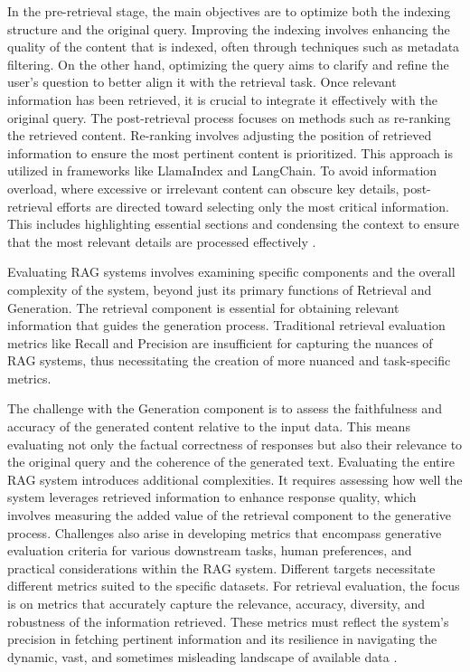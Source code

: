 In the pre-retrieval stage, the main objectives are to optimize both the indexing structure and the original query. Improving the indexing involves enhancing the quality of the content that is indexed, often through techniques such as metadata filtering. On the other hand, optimizing the query aims to clarify and refine the user's question to better align it with the retrieval task. Once relevant information has been retrieved, it is crucial to integrate it effectively with the original query. The post-retrieval process focuses on methods such as re-ranking the retrieved content. Re-ranking involves adjusting the position of retrieved information to ensure the most pertinent content is prioritized. This approach is utilized in frameworks like LlamaIndex and LangChain. To avoid information overload, where excessive or irrelevant content can obscure key details, post-retrieval efforts are directed toward selecting only the most critical information. This includes highlighting essential sections and condensing the context to ensure that the most relevant details are processed effectively \cite{Gao.18Dec2023}.

Evaluating RAG systems involves examining specific components and the overall complexity of the system, beyond just its primary functions of Retrieval and Generation. The retrieval component is essential for obtaining relevant information that guides the generation process. Traditional retrieval evaluation metrics like Recall and Precision are insufficient for capturing the nuances of RAG systems, thus necessitating the creation of more nuanced and task-specific metrics.

The challenge with the Generation component is to assess the faithfulness and accuracy of the generated content relative to the input data. This means evaluating not only the factual correctness of responses but also their relevance to the original query and the coherence of the generated text. Evaluating the entire RAG system introduces additional complexities. It requires assessing how well the system leverages retrieved information to enhance response quality, which involves measuring the added value of the retrieval component to the generative process. Challenges also arise in developing metrics that encompass generative evaluation criteria for various downstream tasks, human preferences, and practical considerations within the RAG system. Different targets necessitate different metrics suited to the specific datasets. For retrieval evaluation, the focus is on metrics that accurately capture the relevance, accuracy, diversity, and robustness of the information retrieved. These metrics must reflect the system’s precision in fetching pertinent information and its resilience in navigating the dynamic, vast, and sometimes misleading landscape of available data \cite{Yu.13May2024}. 

